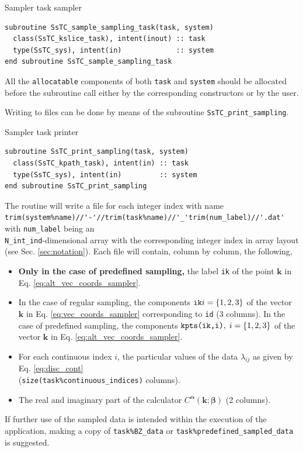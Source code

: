 \documentclass[10pt,a4paper]{article}
\begin{document}
\begin{codebox}{Sampler task sampler}
\begin{lstlisting}[caption={Interface of the sampling task sampler.},captionpos=b]
subroutine SsTC_sample_sampling_task(task, system)
  class(SsTC_kslice_task), intent(inout) :: task
  type(SsTC_sys), intent(in)             :: system
end subroutine SsTC_sample_sampling_task
\end{lstlisting}
\end{codebox}
All the \verb|allocatable| components of both \verb|task| and \verb|system| should be allocated before the subroutine call either by the corresponding constructors or by the user.

Writing to files can be done by means of the subroutine \verb|SsTC_print_sampling|.
\begin{codebox}{Sampler task printer}
\begin{lstlisting}[caption={Interface of the sampling task printer.},captionpos=b]
subroutine SsTC_print_sampling(task, system)
  class(SsTC_kpath_task), intent(in) :: task
  type(SsTC_sys), intent(in)         :: system
end subroutine SsTC_print_sampling
\end{lstlisting}
\end{codebox}
The routine will write a file for each integer index with name \\ \verb|trim(system%name)//'-'//trim(task%name)//'_'trim(num_label)//'.dat'| with \verb|num_label| being an \\ \verb|N_int_ind|-dimensional array with the corresponding integer index in array layout (see Sec. \ref{sec:notation}). Each file will contain, column by column, the following,
\begin{tcolorbox}
\begin{itemize}
\item \textbf{Only in the case of predefined sampling,} the label \verb|ik| of the point $\bm{k}$ in Eq. \eqref{eq:alt_vec_coords_sampler}.
\item In the case of regular sampling, the components $\verb|ik|i=\{1, 2, 3\}$ of the vector $\bm{k}$ in Eq. \eqref{eq:vec_coords_sampler} corresponding to \verb|id| (3 columns). In the case of predefined sampling, the components $\verb|kpts(ik,i)|,\;i=\{1, 2, 3\}$ of the vector $\bm{k}$ in Eq. \eqref{eq:alt_vec_coords_sampler}.
\item For each continuous index $i$, the particular values of the data $\lambda_{ij}$ as given by Eq. \eqref{eq:disc_cont} \\ (\verb|size(task%continuous_indices)| columns).
\item The real and imaginary part of the calculator $C^{\bm{\alpha}}(\bm{k}; \bm{\beta})$ (2 columns).
\end{itemize}
\end{tcolorbox}
If further use of the sampled data is intended within the execution of the application, making a copy of \verb|task%BZ_data| or \verb|task%predefined_sampled_data| is suggested.
\end{document}
